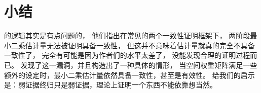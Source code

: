 \documentclass[black,normal,authoryear]{elegantnote}
\begin{document}
    \section{小结}
    \cite{kelejian1997}的逻辑其实是有点问题的，
    他们指出在常见的两个一致性证明框架下，
    两阶段最小二乘估计量无法被证明具备一致性，
    但这并不意味着估计量就真的完全不具备一致性了，
    完全有可能是因为作者们的水平太差了，
    没能发现合理的证明过程而已。
    \cite{lee2002}发现了这一漏洞，并且构造出了一种具体的情形，
    当空间权重矩阵满足一些额外的设定时，最小二乘估计量依然具备一致性，甚至是有效性。
    给我们的启示是：弱证据终归只是弱证据，理论上证明一个东西不能依靠想当然。

    
\end{document}
